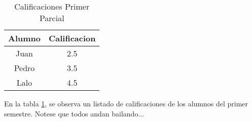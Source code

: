 \documentclass[12pt]{book}
\begin{document}
\begin{table}
	\begin{tabular}{|c|c|}
	\hline
	Alumno & Calificacion \\
	\hline
	Juan & 2.5 \\
	Pedro & 3.5 \\
	Lalo & 4.5 \\
	\hline
	\end{tabular}
\caption{Calificaciones Primer Parcial}
\label{TablaCalifs1}
\end{table}
En la tabla \ref{TablaCalifs1}, se observa un 
listado de calificaciones de los alumnos del 
primer semestre. Notese que todos andan bailando...
\end{document}
